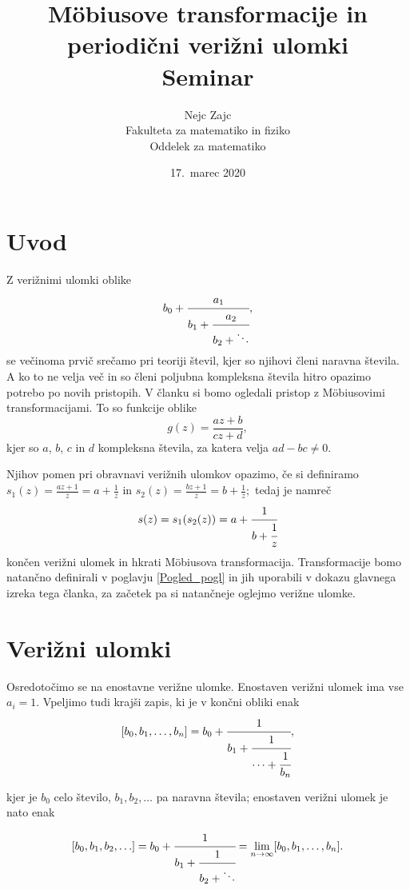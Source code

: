 \documentclass[a4paper,12pt]{article}
\title{M\"{o}biusove transformacije in periodični verižni ulomki \\ 
\Large Seminar}
\author{Nejc Zajc \\
Fakulteta za matematiko in fiziko \\
Oddelek za matematiko}
\date{17.\ marec 2020}
\begin{document}


\maketitle



\section{Uvod}

Z verižnimi ulomki oblike
\[
    b_0 + \cfrac{a_1}{b_1 + \cfrac{a_2}{b_2 + \ddots}},
\]
se večinoma prvič srečamo pri teoriji števil, kjer so njihovi členi naravna števila. A ko to ne velja več in so členi poljubna kompleksna števila hitro opazimo potrebo po novih pristopih. V članku si bomo ogledali pristop z M\"{o}biusovimi transformacijami. To so funkcije oblike 
\begin{equation}
\label{Mob_def}
    g(z) = \frac{az + b}{cz + d},
\end{equation}
kjer so $a$, $b$, $c$ in $d$ kompleksna števila, za katera velja $ad - bc \neq 0.$

Njihov pomen pri obravnavi verižnih ulomkov opazimo, če si definiramo $s_1(z) = \frac{az + 1}{z} = a + \frac{1}{z}$ in $s_2(z) = \frac{bz + 1}{z} = b + \frac{1}{z};$ tedaj je namreč
\[
    s(z) = s_1(s_2(z)) = a + \cfrac{1}{b + \cfrac{1}{z}}  
\]
končen verižni ulomek in hkrati M\"{o}biusova transformacija. Transformacije bomo natančno definirali v poglavju \ref{Pogled_pogl} in jih uporabili v dokazu glavnega izreka tega članka, za začetek pa si natančneje oglejmo verižne ulomke.


\section{Verižni ulomki}

Osredotočimo se na enostavne verižne ulomke. Enostaven verižni ulomek ima vse $a_i = 1$. Vpeljimo tudi krajši zapis, ki je v končni obliki enak
\[
    [b_0, b_1, \ldots, b_n] = b_0 + \cfrac{1}{b_1 + \cfrac{1}{\cdots + \cfrac{1}{b_n}}},
\]

kjer je $b_0$ celo število, $b_1, b_2, \ldots$ pa naravna števila; enostaven verižni ulomek je nato enak

\begin{equation}
\label{Ver_def}
    [b_0, b_1, b_2, \ldots] = b_0 + \cfrac{1}{b_1 + \cfrac{1}{b_2 + \ddots}} = \lim_{n \to \infty} [b_0, b_1, \ldots, b_n].
\end{equation}
\end{document}

